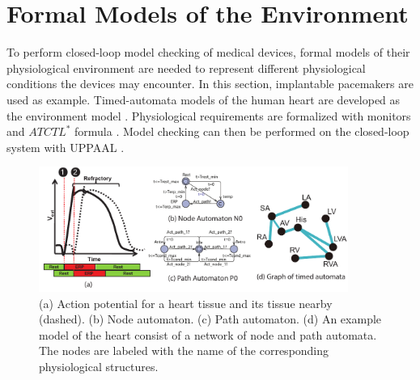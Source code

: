 \section{Formal Models of the Environment}
\label{formalModelsofEnv}
To perform closed-loop model checking of medical devices, formal models of their physiological environment are needed to represent different physiological conditions the devices may encounter. In this section, implantable pacemakers are used as example. Timed-automata \cite{timed_automata} models of the human heart are developed as the environment model \cite{sttt13,VHM_proc}. Physiological requirements are formalized with monitors and $ATCTL^*$ formula \cite{TCTL}. 
Model checking can then be performed on the closed-loop system with UPPAAL \cite{uppaal}. %
\begin{figure}[!t]
	\centering
	\includegraphics[width=0.9\textwidth]{figs/init_abs.pdf}
	\vspace{-20pt}
	\caption{\small (a) Action potential for a heart tissue and its tissue nearby (dashed). (b) Node automaton. (c) Path automaton. (d) An example model of the heart consist of a network of node and path automata. The nodes are labeled with the name of the corresponding physiological structures.}
	\label{fig:nodepathTA}
\end{figure}


